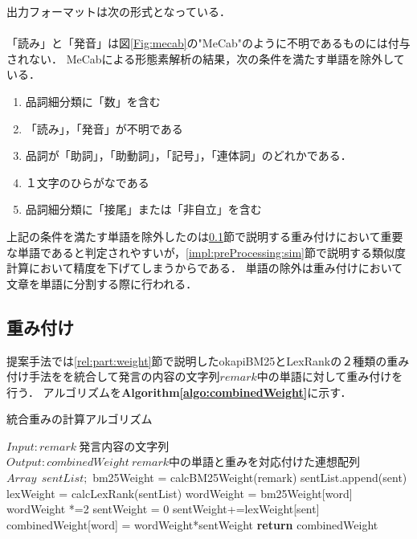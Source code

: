 出力フォーマットは次の形式となっている．\\
\\
「読み」と「発音」は図\ref{Fig:mecab}の"MeCab"のように不明であるものには付与されない．
MeCabによる形態素解析の結果，次の条件を満たす単語を除外している．
\begin{enumerate}
  \item 品詞細分類に「数」を含む
  \item 「読み」，「発音」が不明である
  \item 品詞が「助詞」，「助動詞」，「記号」，「連体詞」のどれかである． 
  \item １文字のひらがなである
  \item 品詞細分類に「接尾」または「非自立」を含む
\end{enumerate}
上記の条件を満たす単語を除外したのは\ref{impl:preProcessing:weight}節で説明する重み付けにおいて重要な単語であると判定されやすいが，\ref{impl:preProcessing:sim}節で説明する類似度計算において精度を下げてしまうからである．
単語の除外は重み付けにおいて文章を単語に分割する際に行われる．

\subsection{重み付け}
\label{impl:preProcessing:weight}
提案手法では\ref{rel:part:weight}節で説明したokapiBM25とLexRankの２種類の重み付け手法をを統合して発言の内容の文字列$remark$中の単語に対して重み付けを行う．
アルゴリズムを\textbf{Algorithm\ref{algo:combinedWeight}}に示す．
\begin{algorithm}
\caption{統合重みの計算アルゴリズム} \label{algo:combinedWeight}
\begin{algorithmic}[1]
\State $Input: remark  ~ 発言内容の文字列$
\State $Output:  combinedWeight ~ remark中の単語と重みを対応付けた連想配列$
\State $Array ~~ sentList;$ 
	\State bm25Weight = calcBM25Weight(remark)
		\State sentList.append(sent)
	\EndFor
	\State lexWeight = calcLexRank(sentList)
	 \label{algo:combinedWight:for1-b}
	 	\State wordWeight = bm25Weight[word]
			\State wordWeight *=2\label{algo:combinedWight:pNoun}
		\EndIf
		\State sentWeight = 0
		\label{algo:combinedWight:for2-b}
				\State sentWeight+=lexWeight[sent]
			\EndIf
		\EndFor\label{algo:combinedWight:for2-e}
		\State combinedWeight[word] = wordWeight*sentWeight \label{algo:combinedWight:final}
	 \EndFor\label{algo:combinedWeight:for1-e}
	\State \textbf{return} combinedWeight
\EndProcedure
\end{algorithmic}
\end{algorithm}

